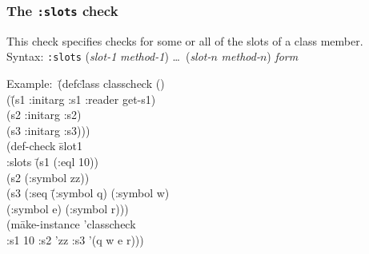 \documentclass{article}
\begin{document}
\subsubsection{The \texttt{:slots} check} 
This check specifies checks for some or all of the slots of a class
member.
\\ Syntax: \texttt{:slots} (\textit{slot-1} \textit{method-1})  \ldots\ (\textit{slot-$n$} \textit{method-$n$}) \textit{form}
{\ttfamily\begin{tabbing}
\textrm{Example:}\ \= (defc\=lass classcheck ()
\\ \> \> (\=(s1 :initarg :s1 :reader get-s1)
\\ \> \> \> (s2 :initarg :s2)
\\ \> \> \> (s3 :initarg :s3)))
\\ \> (def-check \=slot1
\\ \> \>  :slots \=(s1 (:eql 10))
\\ \> \>  \>(s2 (:symbol zz))
\\ \> \>  \>(s3 (:seq \=(:symbol q) (:symbol w)
\\ \> \>  \> \> (:symbol e) (:symbol r)))
\\ \> \>  (m\=ake-instance 'classcheck
\\ \> \> \>  :s1 10 :s2 'zz :s3 '(q w e r)))
\end{tabbing}}
\end{document}
